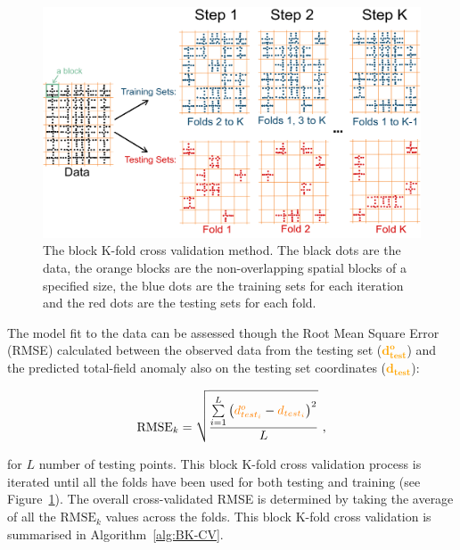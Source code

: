 \begin{figure}[tb]
  \centering
  \includegraphics[width=1\linewidth]{paper/figures/bk_cv.png}
  \caption{
    The block K-fold cross validation method. The black dots are the data, the orange blocks are the non-overlapping spatial blocks of a specified size, the blue dots are the training sets for each iteration and the red dots are the testing sets for each fold.
    }
  \label{fig:BK-CV}
\end{figure}

The model fit to the data can be assessed though the Root Mean Square Error (RMSE) calculated between the observed data from the testing set (\textcolor{orange}{$\mathbf{d^o_{test}}$}) and the predicted total-field anomaly also on the testing set coordinates (\textcolor{orange}{$\mathbf{d_{test}}$}):

\begin{equation}
    \label{eq:rmse}
    \text{RMSE}_k = \sqrt{\dfrac{\sum\limits_{i=1}^L \left(\textcolor{orange}{{d^o_{test_i}}} - \textcolor{orange}{{d_{test_i}}}\right)^2}{L}}
    \ ,
\end{equation}

\noindent
for $L$ number of testing points. This block K-fold cross validation process is iterated until all the folds have been used for both testing and training (see Figure~\ref{fig:BK-CV}). The overall cross-validated RMSE is determined by taking the average of all the $\text{RMSE}_k$ values across the folds. This block K-fold cross validation is summarised in Algorithm~\ref{alg:BK-CV}.

